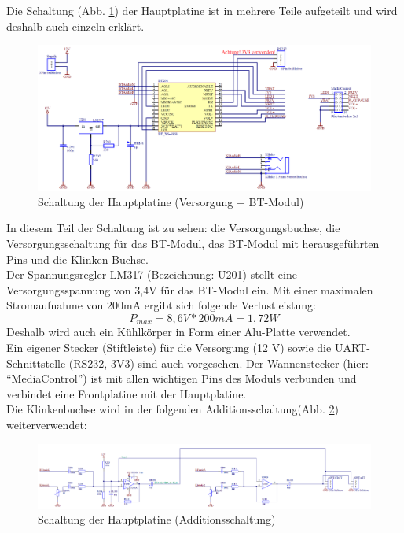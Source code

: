 Die Schaltung (Abb. \ref{fig:5.3.8.2.1}) der Hauptplatine ist in mehrere Teile aufgeteilt und wird deshalb auch einzeln erklärt.
\begin{figure} [H]
	\centering
	\includegraphics[width=1\textwidth]{img/BTModul/hauptboard_sch1.png}
	\caption{Schaltung der Hauptplatine (Versorgung + BT-Modul)}\label {fig:5.3.8.2.1}
\end{figure} 
In diesem Teil der Schaltung ist zu sehen: die Versorgungsbuchse, die Versorgungsschaltung für das BT-Modul, das BT-Modul mit herausgeführten Pins und die Klinken-Buchse.
\\
Der Spannungsregler LM317 (Bezeichnung: U201) stellt eine Versorgungsspannung von 3,4V für das BT-Modul ein. 
Mit einer maximalen Stromaufnahme von 200mA ergibt sich folgende Verlustleistung:
\begin{equation}
	P_{max} = 8,6 V * 200 mA = 1,7 2W
\end{equation}
Deshalb wird auch ein Kühlkörper in Form einer Alu-Platte verwendet.
\\
Ein eigener Stecker (Stiftleiste) für die Versorgung (12 V) sowie die UART-Schnittstelle (RS232, 3V3) sind auch vorgesehen.
Der Wannenstecker (hier: \enquote{MediaControl}) ist mit allen wichtigen Pins des Moduls verbunden und verbindet eine Frontplatine mit der Hauptplatine.
\\
Die Klinkenbuchse wird in der folgenden Additionsschaltung(Abb. \ref {fig:5.3.8.2.2}) weiterverwendet:
\begin{figure} [H]
	\centering
	\includegraphics[width=1\textwidth]{img/BTModul/hauptboard_sch2.png}
	\caption{Schaltung der Hauptplatine (Additionsschaltung)}\label {fig:5.3.8.2.2}
\end{figure}
